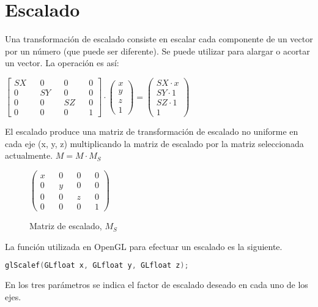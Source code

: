\newpage
\section{Escalado}
Una transformación de escalado consiste en escalar cada componente de un vector por un número (que puede ser diferente). Se puede utilizar para alargar o acortar un vector. La operación es así:

\begin{minipage}{0.3\textwidth}
  \centering
\end{minipage}\begin{minipage}[t]{0.5\textwidth}
  \(
  \begin{bmatrix}
    SX && 0 && 0 && 0\\
    0 && SY && 0 && 0\\
    0 && 0 && SZ && 0\\
    0 && 0 && 0 && 1
  \end{bmatrix}
  \cdot
  \begin{pmatrix}
    x \\ y \\ z \\ 1
  \end{pmatrix}
  =
  \begin{pmatrix}
    SX \cdot x \\
    SY \cdot 1 \\
    SZ \cdot 1 \\
    1
  \end{pmatrix}
  \)
\end{minipage}


El escalado produce una matriz de transformación de escalado no uniforme en cada eje (x, y, z) multiplicando la matriz de escalado por la matriz seleccionada actualmente. $M = M \cdot M_S$
\begin{figure} [ht]
  \centering
  \(
  \begin{pmatrix}
    x && 0 && 0 && 0\\
    0 && y && 0 && 0\\
    0 && 0 && z && 0\\
    0 && 0 && 0 && 1
  \end{pmatrix}
  \)
  \caption{Matriz de escalado, $M_S$}
\end{figure}

La función utilizada en OpenGL para efectuar un escalado es la siguiente.
\begin{lstlisting}[language=C]
  glScalef(GLfloat x, GLfloat y, GLfloat z);
\end{lstlisting}
En los tres parámetros se indica el factor de escalado deseado en cada uno de los ejes.

